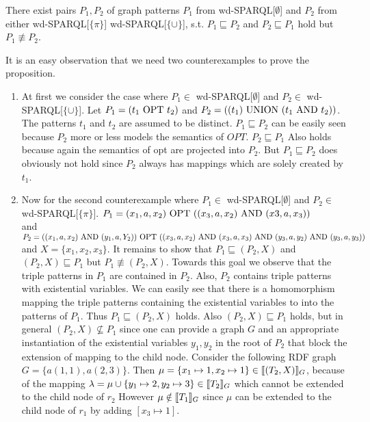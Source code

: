 \begin{proposition}
	There exist pairs $P_1,P_2$ of graph patterns $P_1$ from
	wd-SPARQL[$\emptyset$] and $P_2$ from either wd-SPARQL[$\{\pi\}$]
	wd-SPARQL[$\{\cup\}$], s.t. $P_1 \sqsubseteq P_2$ and $P_2 \sqsubseteq P_1$
	hold but $P_1 \not\equiv P_2$.
\end{proposition}
\begin{proofidea}
	It is an easy observation that we need two counterexamples to prove the
	proposition. 
	\begin{enumerate}	
		\item At first we consider the case where  $P_1 \in$
			wd-SPARQL[$\emptyset$] and  $P_2 \in$ wd-SPARQL[$\{\cup\}$]. Let
			$P_1 = (t_1 \mbox{ OPT } t_2)$ and $P_2 = ((t_1) \mbox{ UNION } (t_1 \mbox{ AND } t_2))$. The patterns $t_1$ and $t_2$
			are assumed to be distinct.
			$P_1 \sqsubseteq P_2$ can be easily seen because $P_2$ more or less models
			the semantics of $OPT$. $P_2 \sqsubseteq P_1$ Also holds because again the
			semantics of opt are projected into $P_2$. But $P_1 \sqsubseteq P_2$ does
			obviously not hold since $P_2$ always has mappings which are solely created by
			$t_1$.
		\item 
			Now for the second counterexample where  $P_1 \in$
			wd-SPARQL[$\emptyset$] and  $P_2 \in$ wd-SPARQL[$\{\pi\}$]. 
			$P_1 = (x_1,a,x_2) \mbox{ OPT } ((x_3,a,x_2) \mbox{ AND } (x3,a,x_3))$\\
			and
			$P_2 = ((x_1,a,x_2) \mbox{ AND } (y_1,a,Y_2)) \mbox{ OPT } ((x_3,a,x_2) \mbox{ AND }
			(x_3,a,x_3)\\ \mbox{ AND } (y_3,a,y_2) \mbox{ AND } (y_3,a,y_3))$ and $X =
			\{x_1,x_2,x_3\}$.
			It remains to show that $P_1 \sqsubseteq (P_2,X)$ and $(P_2,X)
			\sqsubseteq P_1$ but $P_1 \not\equiv (P_2,X)$.
		    Towards this goal we observe that the triple patterns in $P_1$ are
			contained in $P_2$. Also, $P_2$ contains triple patterns with
			existential variables. We can easily see that there is a
			homomorphism mapping the triple patterns containing the existential
			variables to into the
			patterns of $P_1$. Thus $P_1 \sqsubseteq (P_2,X)$ holds. Also
			$(P_2,X) \sqsubseteq P_1$ holds, but in general $(P_2,X) \not\subseteq
			P_1$ since one can provide a graph $G$ and an appropriate
			instantiation of the existential variables $y_1, y_2$ in the root
			of $P_2$ that block the extension of mapping to the child node.
			Consider the following RDF graph $G = \{ a(1,1), a(2,3)\}$. Then
			$\mu = \{x_1 \mapsto 1, x_2 \mapsto 1\} \in \llbracket (T_2,X)\rrbracket_G$,
			because of the mapping $\lambda = \mu \cup \{ y_1 \mapsto 2,
			y_2\mapsto 3 \} \in \llbracket T_2 \rrbracket_G$ which cannot be extended to the
			child node of $r_2$ However $\mu \notin \llbracket T_1\rrbracket_G$ since $\mu$
			can be extended to the child node of $r_1$ by adding $[x_3 \mapsto
		1]$.
			
	\end{enumerate}
\end{proofidea}

